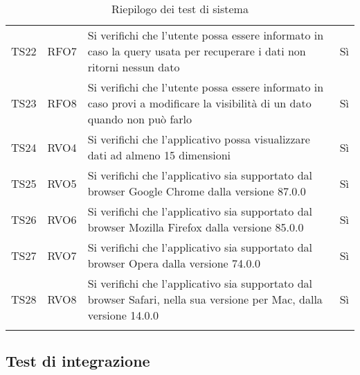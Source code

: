 \documentclass[../piano_di_qualifica.tex]{subfiles}
\begin{document}
\begin{center}
\begin{longtable}{|c|c|p{8cm}|c|}
		TS22              & RFO7                   & Si verifichi che l'utente possa essere informato in caso la query usata per recuperare i dati non ritorni nessun dato     & Sì                         \\
		TS23              & RFO8                   & Si verifichi che l'utente possa essere informato in caso provi a modificare la visibilità di un dato quando non può farlo & Sì                         \\
		TS24              & RVO4                   & Si verifichi che l'applicativo possa visualizzare dati ad almeno 15 dimensioni                                            & Sì                         \\
		TS25              & RVO5                   & Si verifichi che l'applicativo sia supportato dal browser Google Chrome dalla versione 87.0.0                             & Sì                         \\
		TS26              & RVO6                   & Si verifichi che l'applicativo sia supportato dal browser Mozilla Firefox dalla versione 85.0.0                           & Sì                         \\
		TS27              & RVO7                   & Si verifichi che l'applicativo sia supportato dal browser Opera dalla versione 74.0.0                                     & Sì                         \\
		TS28              & RVO8                   & Si verifichi che l'applicativo sia supportato dal browser Safari, nella sua versione per Mac, dalla versione 14.0.0       & Sì                         \\
		\hline
		\rowcolor{white}
		\caption{Riepilogo dei test di sistema}
	\end{longtable}
\end{center}

\subsection{Test di integrazione}%
\label{sub:test_int}
\end{document}
